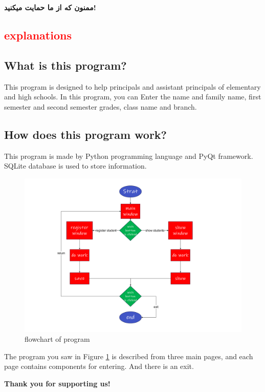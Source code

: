 \documentclass{article}
\begin{document}
\begin{center}
	{\LARGE\textbf{ ممنون که از ما حمایت میکنید!}}
\end{center}
\cleardoublepage
\begin{latin}
\section*{{\huge \textcolor{red}{\textbf{explanations}}}}
\subsection*{What is this program?}
This program is designed to help principals and assistant principals of elementary and high schools. In this program, you can
Enter the name and family name, first semester and second semester grades, class name and branch.

\subsection*{How does this program work?}
This program is made by Python programming language and PyQt framework.
SQLite database is used to store information.

\begin{figure}[h!]
	\centering
	\includegraphics[width=\linewidth]{floen.png}
	\caption{flowchart of program}\label{pic2}
\end{figure}

The program you saw in Figure \ref{pic2} is described from three main pages, and each page contains components for entering.
And there is an exit.\\
\begin{center}
{\LARGE\textbf{ Thank you for supporting us!}}
\end{center}
\end{latin}
\end{document}
